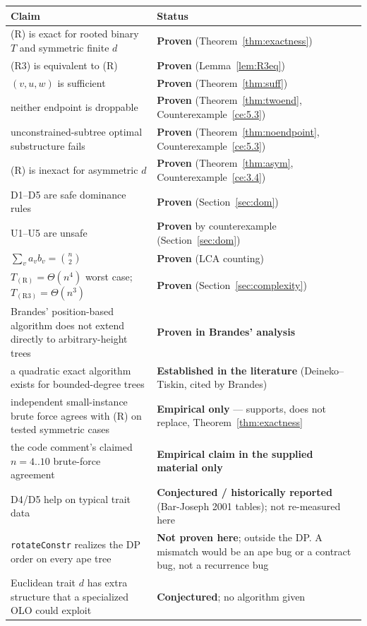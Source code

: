 \documentclass[11pt]{article}
\theoremstyle{plain}
\begin{document}
\begin{center}
\renewcommand{\arraystretch}{1.35}
\begin{tabular}{@{}p{11.2cm} p{4.3cm}@{}}
\toprule
Claim & Status \\
\midrule
(R) is exact for rooted binary \(T\) and symmetric finite \(d\) &
\textbf{Proven} (Theorem~\ref{thm:exactness}) \\
(R3) is equivalent to (R) & \textbf{Proven} (Lemma~\ref{lem:R3eq}) \\
\((v,u,w)\) is sufficient & \textbf{Proven} (Theorem~\ref{thm:suff}) \\
neither endpoint is droppable & \textbf{Proven}
(Theorem~\ref{thm:twoend}, Counterexample~\ref{ce:5.3}) \\
unconstrained-subtree optimal substructure fails & \textbf{Proven}
(Theorem~\ref{thm:noendpoint}, Counterexample~\ref{ce:5.3}) \\
(R) is inexact for asymmetric \(d\) & \textbf{Proven}
(Theorem~\ref{thm:asym}, Counterexample~\ref{ce:3.4}) \\
D1--D5 are safe dominance rules & \textbf{Proven}
(Section~\ref{sec:dom}) \\
U1--U5 are unsafe & \textbf{Proven} by counterexample
(Section~\ref{sec:dom}) \\
\(\sum_v a_v b_v = \binom{n}{2}\) & \textbf{Proven} (LCA counting) \\
\(T_{\mathrm{(R)}} = \Theta(n^4)\) worst case; \(T_{\mathrm{(R3)}} =
\Theta(n^3)\) & \textbf{Proven} (Section~\ref{sec:complexity}) \\
Brandes' position-based algorithm does not extend directly to arbitrary-height
trees & \textbf{Proven in Brandes' analysis} \\
a quadratic exact algorithm exists for bounded-degree trees &
\textbf{Established in the literature} (Deineko--Tiskin, cited by Brandes) \\
independent small-instance brute force agrees with (R) on tested symmetric
cases & \textbf{Empirical only} --- supports, does not replace,
Theorem~\ref{thm:exactness} \\
the code comment's claimed \(n=4..10\) brute-force agreement &
\textbf{Empirical claim in the supplied material only} \\
D4/D5 help on typical trait data & \textbf{Conjectured / historically
reported} (Bar-Joseph 2001 tables); not re-measured here \\
\texttt{rotateConstr} realizes the DP order on every ape tree &
\textbf{Not proven here}; outside the DP. A mismatch would be an ape bug or a
contract bug, not a recurrence bug \\
Euclidean trait \(d\) has extra structure that a specialized OLO could exploit
& \textbf{Conjectured}; no algorithm given \\
\bottomrule
\end{tabular}
\end{center}
\end{document}
